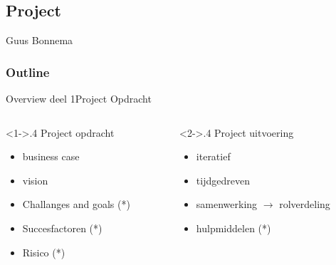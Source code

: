 \begin{frame}
    \section{Project}

    Guus Bonnema
\end{frame}

\begin{frame}[label=outline]
    \frametitle{Outline}
    \tableofcontents[pausesections]
\end{frame}



\begin{frame}[label=opdracht]{Overview deel 1}{Project Opdracht}

    \begin{columns}
        \begin{column}<1->{.4\textwidth}
	    Project opdracht

	    \begin{itemize}
		\item business case
		\item vision
		\item Challanges and goals (*)
		\item Succesfactoren (*)
		\item Risico (*)
	    \end{itemize}
        \end{column}
        \begin{column}<2->{.4\textwidth}
	    Project uitvoering

	    \begin{itemize}
		\item iteratief
		\item tijdgedreven
		\item samenwerking $\rightarrow$ rolverdeling
		\item hulpmiddelen (*)
	    \end{itemize}
        \end{column}


    \end{columns}



\end{frame}

